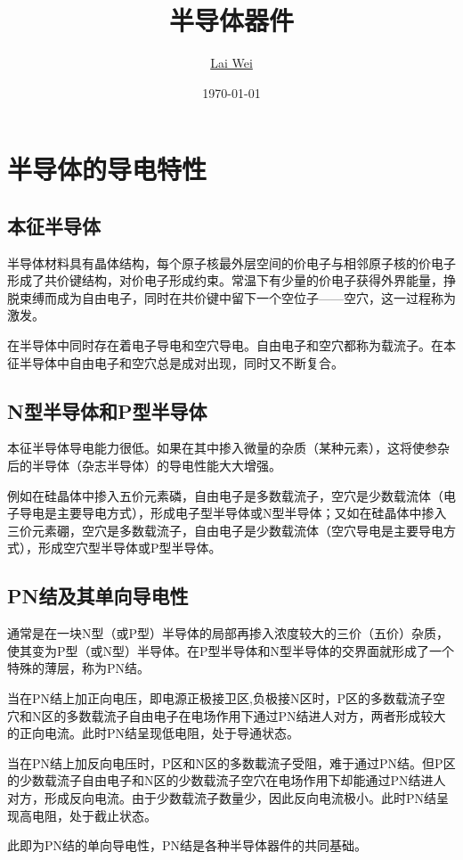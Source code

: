 \documentclass[12pt]{article}
\title{半导体器件}
\author{\href{mailto:lai-wei@whu.edu.cn}{Lai Wei}}
\date{\today}
\begin{document}
\maketitle

\section{半导体的导电特性}

\subsection{本征半导体}

半导体材料具有晶体结构，每个原子核最外层空间的价电子与相邻原子核的价电子形成了共价键结构，对价电子形成约束。常温下有少量的价电子获得外界能量，挣脱束缚而成为自由电子，同时在共价键中留下一个空位子——空穴，这一过程称为激发。

在半导体中同时存在着电子导电和空穴导电。自由电子和空穴都称为载流子。在本征半导体中自由电子和空穴总是成对出现，同时又不断复合。

\subsection{N型半导体和P型半导体}

本征半导体导电能力很低。如果在其中掺入微量的杂质（某种元素），这将使参杂后的半导体（杂志半导体）的导电性能大大增强。

例如在硅晶体中掺入五价元素磷，自由电子是多数载流子，空穴是少数载流体（电子导电是主要导电方式），形成电子型半导体或N型半导体；又如在硅晶体中掺入三价元素硼，空穴是多数载流子，自由电子是少数载流体（空穴导电是主要导电方式），形成空穴型半导体或P型半导体。

\subsection{PN结及其单向导电性}

通常是在一块N型（或P型）半导体的局部再掺入浓度较大的三价（五价）杂质，使其变为P型（或N型）半导体。在P型半导体和N型半导体的交界面就形成了一个特殊的薄层，称为PN结。

当在PN结上加正向电压，即电源正极接卫区,负极接N区时，P区的多数载流子空穴和N区的多数载流子自由电子在电场作用下通过PN结进人对方，两者形成较大的正向电流。此时PN结呈现低电阻，处于导通状态。

当在PN结上加反向电压时，P区和N区的多数載流子受阻，难于通过PN结。但P区的少数载流子自由电子和N区的少数载流子空穴在电场作用下却能通过PN结进人对方，形成反向电流。由于少数载流子数量少，因此反向电流极小。此时PN结呈现高电阻，处于截止状态。

此即为PN结的单向导电性，PN结是各种半导体器件的共同基础。
\end{document}
